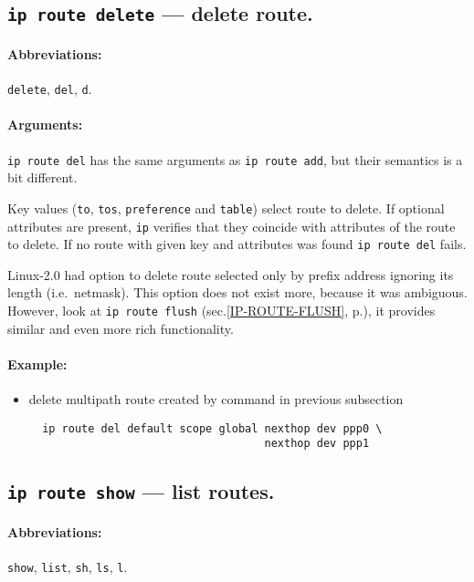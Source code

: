\subsection{{\tt ip route delete} --- delete route.}

\paragraph{Abbreviations:} \verb|delete|, \verb|del|, \verb|d|.

\paragraph{Arguments:} \verb|ip route del| has the same arguments as
\verb|ip route add|, but their semantics is a bit different.

Key values (\verb|to|, \verb|tos|, \verb|preference| and \verb|table|)
select route to delete. If optional attributes are present, \verb|ip|
verifies that they coincide with attributes of the route to delete.
If no route with given key and attributes was found \verb|ip route del|
fails.
\begin{NB}
Linux-2.0 had option to delete route selected only by prefix address
ignoring its length (i.e.\ netmask). This option does not exist more,
because it was ambiguous. However, look at {\tt ip route flush}
(sec.\ref{IP-ROUTE-FLUSH}, p.\pageref{IP-ROUTE-FLUSH}), it
provides similar and even more rich functionality.
\end{NB}

\paragraph{Example:}
\begin{itemize}
\item delete multipath route created by command in previous subsection
\begin{verbatim}
  ip route del default scope global nexthop dev ppp0 \
                                    nexthop dev ppp1
\end{verbatim}
\end{itemize}



\subsection{{\tt ip route show} --- list routes.}

\paragraph{Abbreviations:} \verb|show|, \verb|list|, \verb|sh|, \verb|ls|, \verb|l|.

